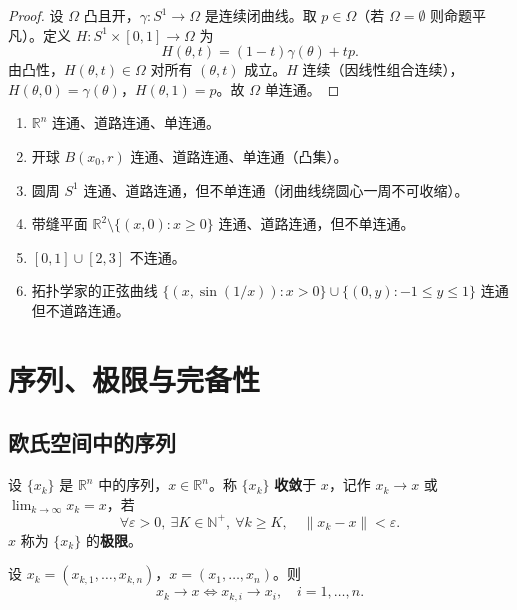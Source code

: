 \begin{proof}
设 $\Omega$ 凸且开，$\gamma: S^1 \to \Omega$ 是连续闭曲线。取 $p \in \Omega$（若 $\Omega = \emptyset$ 则命题平凡）。定义 $H: S^1 \times [0, 1] \to \Omega$ 为
\[
H(\theta, t) = (1 - t) \gamma(\theta) + t p.
\]
由凸性，$H(\theta, t) \in \Omega$ 对所有 $(\theta, t)$ 成立。$H$ 连续（因线性组合连续），$H(\theta, 0) = \gamma(\theta)$，$H(\theta, 1) = p$。故 $\Omega$ 单连通。
\end{proof}

\begin{example}[连通性与单连通性的对照]\label{ex:connected_examples}
\begin{enumerate}[label=(\roman*)]
    \item $\mathbb{R}^n$ 连通、道路连通、单连通。
    \item 开球 $B(x_0, r)$ 连通、道路连通、单连通（凸集）。
    \item 圆周 $S^1$ 连通、道路连通，但不单连通（闭曲线绕圆心一周不可收缩）。
    \item 带缝平面 $\mathbb{R}^2 \setminus \{(x, 0) : x \geq 0\}$ 连通、道路连通，但不单连通。
    \item $[0, 1] \cup [2, 3]$ 不连通。
    \item 拓扑学家的正弦曲线 $\{(x, \sin(1/x)) : x > 0\} \cup \{(0, y) : -1 \le y \le 1\}$ 连通但不道路连通。
\end{enumerate}
\end{example}

\section{序列、极限与完备性}

\subsection{欧氏空间中的序列}

\begin{definition}[序列收敛]\label{def:sequence_convergence}
设 $\{x_k\}$ 是 $\mathbb{R}^n$ 中的序列，$x \in \mathbb{R}^n$。称 $\{x_k\}$ \textbf{收敛}于 $x$，记作 $x_k \to x$ 或 $\lim_{k \to \infty} x_k = x$，若
\[
\forall \varepsilon > 0,\ \exists K \in \mathbb{N}^+,\ \forall k \ge K,\quad \|x_k - x\| < \varepsilon.
\]
$x$ 称为 $\{x_k\}$ 的\textbf{极限}。
\end{definition}

\begin{proposition}[收敛的坐标刻画]\label{prop:coordinate_convergence}
设 $x_k = (x_{k,1}, \dots, x_{k,n})$，$x = (x_1, \dots, x_n)$。则
\[
x_k \to x \iff x_{k,i} \to x_i,\quad i = 1, \dots, n.
\]
\end{proposition}

